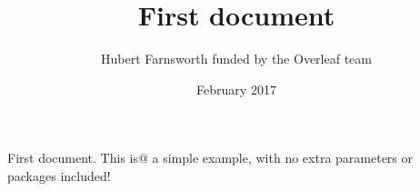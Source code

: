 \documentclass{article}
\title{First document}
\author{Hubert Farnsworth funded by the Overleaf team}
\date{February 2017}
\begin{document}
First document. This is@ a simple example, with no 
extra parameters or packages included!
\end{document}
